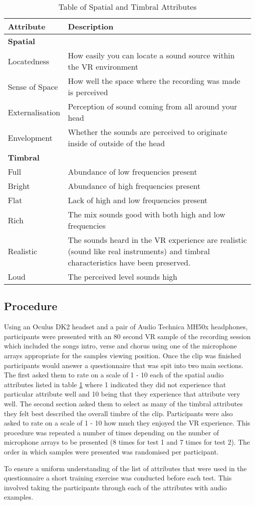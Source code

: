 		\begin{table}[h]
			\begin{tabular}{m{2.2cm} | m{}}
				\textbf{Attribute} & \textbf{Description} \\ \hline
				\multicolumn{2}{l}{\textbf{Spatial}} \\ \hline
				Locatedness & How easily you can locate a sound source within the VR environment \\
				Sense of Space & How well the space where the recording was made is perceived \\
				Externalisation & Perception of sound coming from all around your head \\
				Envelopment & Whether the sounds are perceived to originate inside of outside of the head \\ \hline
				\multicolumn{2}{l}{\textbf{Timbral}} \\ \hline
				Full & Abundance of low frequencies present \\
				Bright & Abundance of high frequencies present \\
				Flat & Lack of high and low frequencies present \\
				Rich & The mix sounds good with both high and low frequencies \\
				Realistic & The sounds heard in the VR experience are realistic (sound like real instruments) and timbral characteristics have been preserved. \\
				Loud & The perceived level sounds high
			\end{tabular}
			\caption{Table of Spatial and Timbral Attributes}
			\label{table:attTable}
		\end{table} 
			

	\subsection{Procedure}

		Using an Oculus DK2 headset and a pair of Audio Technica MH50x headphones, participants were presented with an 80 second VR sample of the recording session which included the songs intro, verse and chorus using one of the microphone arrays appropriate for the samples viewing position. Once the clip was finished participants would answer a questionnaire that was spit into two main sections. The first asked them to rate on a scale of 1 - 10 each of the spatial audio attributes listed in table \ref{table:attTable} where 1 indicated they did not experience that particular attribute well and 10 being that they experience that attribute very well. The second section asked them to select as many of the timbral attributes they felt best described the overall timbre of the clip. Participants were also asked to rate on a scale of 1 - 10 how much they enjoyed the VR experience. This procedure was repeated a number of times depending on the number of microphone arrays to be presented (8 times for test 1 and 7 times for test 2). The order in which samples were presented was randomised per participant.

		To ensure a uniform understanding of the list of attributes that were used in the questionnaire a short training exercise was conducted before each test. This involved taking the participants through each of the attributes with audio examples. 

